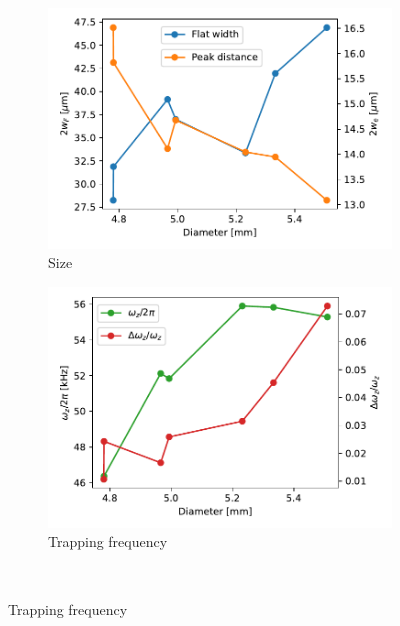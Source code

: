 \begin{figure}
    \begin{subfigure}{0.5\textwidth}
        \includegraphics[width=\textwidth]{chapters/chapter_3/figures/size.pdf}
        \caption{Size}
        \label{fig:diam_size}
    \end{subfigure}
    \begin{subfigure}{0.5\textwidth}
        \includegraphics[width=\textwidth]{chapters/chapter_3/figures/trapp_freq.pdf}
        \caption{Trapping frequency}
        \label{fig:diam_trap}
    \end{subfigure}\\


\end{figure}
